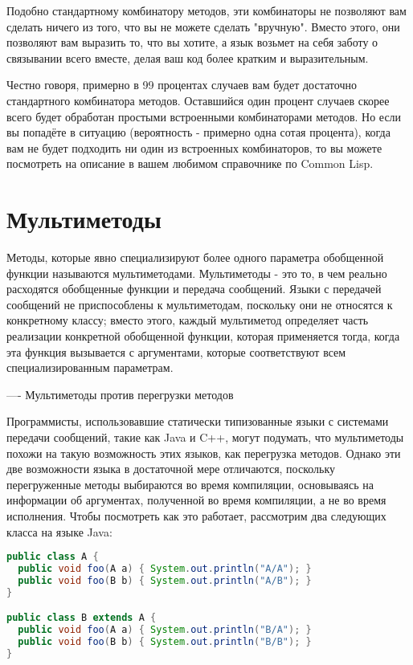 Подобно стандартному комбинатору методов, эти комбинаторы не позволяют вам сделать ничего
из того, что вы не можете сделать "вручную".  Вместо этого, они позволяют вам выразить то,
что вы хотите, а язык возьмет на себя заботу о связывании всего вместе, делая ваш код
более кратким и выразительным.

Честно говоря, примерно в 99 процентах случаев вам будет достаточно стандартного
комбинатора методов.  Оставшийся один процент случаев скорее всего будет обработан
простыми встроенными комбинаторами методов.  Но если вы попадёте в ситуацию (вероятность -
примерно одна сотая процента), когда вам не будет подходить ни один из встроенных
комбинаторов, то вы можете посмотреть на описание  в вашем
любимом справочнике по Common Lisp.

\section{Мультиметоды}

Методы, которые явно специализируют более одного параметра обобщенной функции называются
мультиметодами. Мультиметоды - это то, в чем реально расходятся обобщенные функции и
передача сообщений.  Языки с передачей сообщений не приспособлены к мультиметодам,
поскольку они не относятся к конкретному классу; вместо этого, каждый мультиметод
определяет часть реализации конкретной обобщенной функции, которая применяется тогда,
когда эта функция вызывается с аргументами, которые соответствуют всем специализированным
параметрам.

----
Мультиметоды против перегрузки методов

Программисты, использовавшие статически типизованные языки с системами передачи сообщений,
такие как Java и C++, могут подумать, что мультиметоды похожи на такую возможность этих
языков, как перегрузка методов.  Однако эти две возможности языка в достаточной мере
отличаются, поскольку перегруженные методы выбираются во время компиляции, основываясь на
информации об аргументах, полученной во время компиляции, а не во время исполнения.  Чтобы
посмотреть как это работает, рассмотрим два следующих класса на языке Java:

\begin{lstlisting}[language=java]
public class A {
  public void foo(A a) { System.out.println("A/A"); }
  public void foo(B b) { System.out.println("A/B"); }
}

public class B extends A {
  public void foo(A a) { System.out.println("B/A"); }
  public void foo(B b) { System.out.println("B/B"); }
}
\end{lstlisting}


